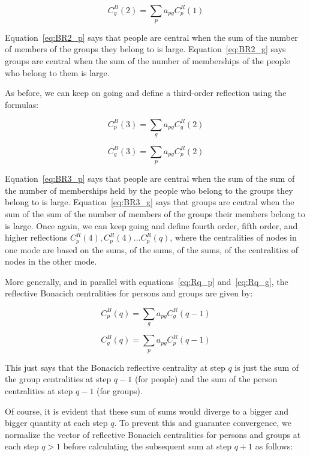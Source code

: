 \documentclass[a4paper,fleqn]{cas-sc}
\begin{document}
\begin{equation}
   C^B_g(2) = \sum_p a_{pg}C^R_p(1)
   \label{eq:BR2_g}
\end{equation}

Equation~\ref{eq:BR2_p} says that people are central when the sum of the number of members of the groups they belong to is large. Equation~\ref{eq:BR2_g} says groups are central when the sum of the number of memberships of the people who belong to them is large. 

As before, we can keep on going and define a third-order reflection using the formulas:

\begin{equation}
   C^B_p(3) = \sum_g a_{pg}C^R_g(2)
   \label{eq:BR3_p}
\end{equation} 

\begin{equation}
   C^B_g(3) = \sum_p a_{pg}C^R_p(2)
   \label{eq:BR3_g}
\end{equation}

Equation~\ref{eq:BR3_p} says that people are central when the sum of the sum of the number of memberships held by the people who belong to the groups they belong to is large. Equation~\ref{eq:BR3_g} says that groups are central when the sum of the sum of the number of members of the groups their members belong to is large. Once again, we can keep going and define fourth order, fifth order, and higher reflections $C^R_p(4), C^R_p(4) \ldots C^R_p(q)$, where the centralities of nodes in one mode are based on the sums, of the sums, of the sums, of the centralities of nodes in the other mode.

More generally, and in parallel with equations~\ref{eq:Rq_p} and~\ref{eq:Rq_g}, the reflective Bonacich centralities for persons and groups are given by:

\begin{equation}
   C^B_p(q) = \sum_g a_{pg}C^R_g(q-1)
   \label{eq:BRq_p}
\end{equation} 

\begin{equation}
   C^B_g(q) = \sum_p a_{pg}C^R_p(q-1)
   \label{eq:BRq_g}
\end{equation} 

This just says that the Bonacich reflective centrality at step $q$ is just the sum of the group centralities at step $q-1$ (for people) and the sum of the person centralities at step $q-1$ (for groups). 

Of course, it is evident that these sum of sums would diverge to a bigger and bigger quantity at each step $q$. To prevent this and guarantee convergence, we normalize the vector of reflective Bonacich centralities for persons and groups at each step $q > 1$ before calculating the subsequent sum at step $q+1$ as follows:
\end{document}
